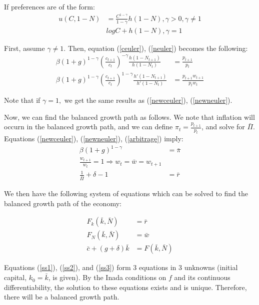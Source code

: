 \documentclass[11pt]{article} %
\begin{document}
If preferences are of the form:
\begin{align*}
u(C,1-N) &= \frac{C^{1-\gamma}}{1-\gamma}h (1-N), \gamma >0, \gamma \neq 1\\
& logC + h(1-N), \gamma = 1
\end{align*}

First, assume $\gamma \neq 1.$ Then, equation (\ref{ceuler}), (\ref{neuler}) becomes the following:
\begin{align}
\beta (1+g)^{1-\gamma}\left( \frac{c_{t+1}}{c_t}\right)^{-\gamma} \frac{h(1-N_{t+1})}{h(1-N_t)} &= \frac{p_{t+1}}{p_t} \label{newceuler} \\
\beta (1+g)^{1-\gamma}\left( \frac{c_{t+1}}{c_t}\right)^{1-\gamma} \frac{h'(1-N_{t+1})}{h'(1-N_t)} &= \frac{p_{t+1}w_{t+1}}{p_tw_t} \label{newneuler}
\end{align}

Note that if $\gamma=1,$ we get the same results as (\ref{newceuler}), (\ref{newneuler}).

Now, we can find the balanced growth path as follows. We note that inflation will occurn in the balanced growth path, and we can define $\pi_t = \frac{p_{t+1}}{p_t}$, and solve for $\bar{\Pi}$. Equations (\ref{newceuler}), (\ref{newneuler}), (\ref{arbitrage}) imply:
\begin{align*}
\beta(1+g)^{1-\gamma} &= \bar{\pi}\\
\frac{w_{t+1}}{w_t} = 1 \Rightarrow w_t = \bar{w} = w_{t+1} \\
\frac{1}{\bar{\Pi}} + \delta - 1 &= \bar{r}
\end{align*}

We then have the following system of equations which can be solved to find the balanced growth path of the economy:

\begin{align}
F_k(\bar{k},\bar{N}) &= \bar{r} \label{ss1}\\
F_N(\bar{k},\bar{N}) &= \bar{w}\label{ss2} \\
\bar{c} + (g+\delta)\bar{k} &= F(\bar{k},\bar{N}) \label{ss3}
\end{align}

Equations (\ref{ss1}), (\ref{ss2}), and (\ref{ss3}) form 3 equations in 3 unknowns (initial capital, $k_0 = \bar{k}$, is given). By the Inada conditions on $f$ and its continuous differentiability, the solution to these equations exists and is unique. Therefore, there will be a balanced growth path.
\end{document}
